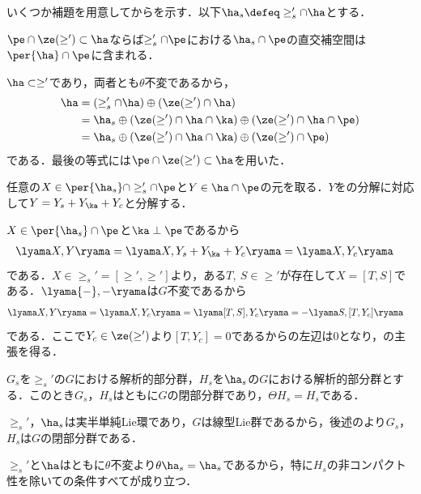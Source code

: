 いくつか補題を用意してからを示す．以下$\ha_s\defeq \ge_{s}'\cap\ha $とする．
\begin{lem}\label{lem:0117-perp}
  $\pe\cap \ze(\ge')\subset \ha $ならば$\ge'_s\cap\pe $における$\ha_s\cap \pe$の直交補空間は$\per{\ha}\cap\pe $に含まれる．
\end{lem}
\begin{npfwn}
  $\ha\subset \ge' $であり，両者とも$\theta$不変であるから，
  \begin{align}
    \ha &= (\ge'_s\cap \ha)\oplus (\ze(\ge')\cap\ha )\notag \\
        &= \ha_s\oplus (\ze(\ge')\cap\ha\cap\ka )\oplus (\ze(\ge')\cap\ha\cap\pe ) \notag\\
        &= \ha_s\oplus (\ze(\ge')\cap\ha\cap\ka )\oplus (\ze(\ge')\cap\pe ) \label{eq:0117-perp}
  \end{align}
  である．最後の等式には$\pe\cap \ze(\ge')\subset \ha $を用いた．

  任意の$X\in \per{\ha_s}\cap \ge'_s\cap\pe $と$Y\in \ha\cap\pe $の元を取る．$Y$をの分解に対応して$Y = Y_s + Y_{\ka} + Y_{c} $と分解する．
  
  $X\in\per{\ha_s}\cap \pe $と$\ka\perp\pe $であるから
  \begin{align*}
    \lyama X, Y\ryama &= \lyama X, Y_s + Y_{\ka} + Y_{c}\ryama = \lyama X,   Y_{c}\ryama
  \end{align*}
  である．$X\in \ge_{s}' = [\ge', \ge'] $より，ある$T,\ S\in \ge'$が存在して$X = [T, S] $である．$\lyama {-}, {-}\ryama $は$G$不変であるから
  \begin{align}
    \lyama X, Y\ryama &= \lyama X,   Y_{c}\ryama = \lyama [T, S],   Y_{c}\ryama = -\lyama S,   [T, Y_{c}]\ryama\label{eq:0117-perp-2}
  \end{align}
  である．ここで$Y_c\in \ze(\ge') $より$[T, Y_c ]= 0$であるからの左辺は0となり，の主張を得る．
\end{npfwn}

\begin{lem}\label{lem:0117-closed}
  $G_s $を$\ge_{s}' $の$G$における解析的部分群，$H_s $を$\ha_s $の$G$における解析的部分群とする．このとき$G_s$，$H_s$はともに$G$の閉部分群であり，$\Theta H_s = H_s $である．
\end{lem}
\begin{npfwn}
  $\ge_s' $，$\ha_s $は実半単純Lie環であり，$G$は線型Lie群であるから，後述のより$G_s$，$H_s$は$G$の閉部分群である．

  $\ge_{s}'$と$\ha $はともに$\theta$不変より$\theta \ha_s = \ha_s $であるから，特に$H_s$の非コンパクト性を除いての条件すべてが成り立つ．
\end{npfwn}

